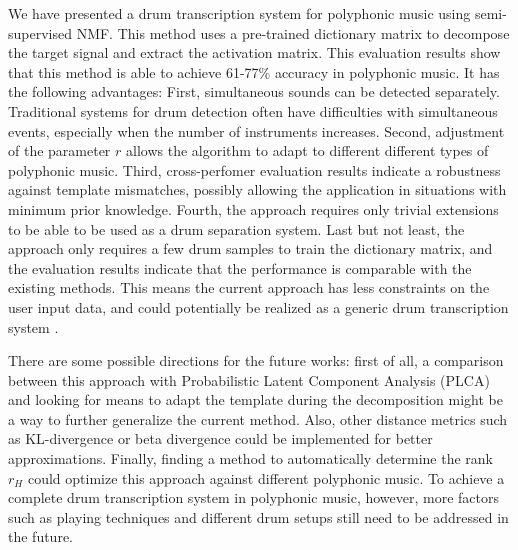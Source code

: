 \documentclass{article}
\begin{document}
We have presented a drum transcription system for polyphonic music using semi-supervised NMF. This method uses a pre-trained dictionary matrix to decompose the target signal and extract the activation matrix. This evaluation results show that this method is able to achieve 61-77\% accuracy in polyphonic music. 
It has the following advantages: 
First, simultaneous sounds can be detected separately. Traditional systems for drum detection often have difficulties with simultaneous events, especially when the number of instruments increases. 
Second, adjustment of the parameter $r$ allows the algorithm to adapt to different different types of polyphonic music. 
Third, cross-perfomer evaluation results indicate a robustness against template mismatches, possibly allowing the application in situations with minimum prior knowledge. %
Fourth, the approach requires only trivial extensions to be able to be used as a drum separation system.
Last but not least, the approach only requires a few drum samples to train the dictionary matrix, and the evaluation results indicate that the performance is comparable with the existing methods. This means the current approach has less constraints on the user input data, and could potentially be realized as a generic drum transcription system .

There are some possible directions for the future works: first of all, a comparison between this approach with Probabilistic Latent Component Analysis (PLCA) and looking for means to adapt the template during the decomposition might be a way to further generalize the current method. Also, other distance metrics such as KL-divergence or beta divergence could be implemented for better approximations. Finally, finding a method to automatically determine the rank $r_H$ could optimize this approach against different polyphonic music. To achieve a complete drum transcription system in polyphonic music, however, more factors such as playing techniques and different drum setups still need to be addressed in the future. 
\end{document}
